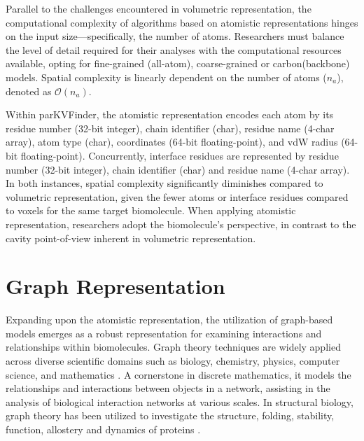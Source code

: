 \documentclass[Ingles]{phdthesis}
\begin{document}
Parallel to the challenges encountered in volumetric representation, the computational complexity of algorithms based on atomistic representations hinges on the input size---specifically, the number of atoms. Researchers must balance the level of detail required for their analyses with the computational resources available, opting for fine-grained (all-atom), coarse-grained or carbon\textalpha\space (backbone) models. Spatial complexity is linearly dependent on the number of atoms ($n_a$), denoted as $\mathcal{O}(n_a)$. 

Within parKVFinder, the atomistic representation encodes each atom by its residue number (32-bit integer), chain identifier (char), residue name (4-char array), atom type (char), coordinates (64-bit floating-point), and \acs{vdW} radius (64-bit floating-point). Concurrently, interface residues are represented by residue number (32-bit integer), chain identifier (char) and residue name (4-char array). In both instances, spatial complexity significantly diminishes compared to volumetric representation, given the fewer atoms or interface residues compared to voxels for the same target biomolecule. When applying atomistic representation, researchers adopt the biomolecule's perspective, in contrast to the cavity point-of-view inherent in volumetric representation.

\section{Graph Representation \label{sec:graph-representation}}

Expanding upon the atomistic representation, the utilization of graph-based models emerges as a robust representation for examining interactions and relationships within biomolecules. Graph theory techniques are widely applied across diverse scientific domains such as biology, chemistry, physics, computer science, and mathematics \cite{foulds1995, majeed2020}. A cornerstone in discrete mathematics, it models the relationships and interactions between objects in a network, assisting in the analysis of biological interaction networks at various scales. In structural biology, graph theory has been utilized to investigate the structure, folding, stability, function, allostery and dynamics of proteins \cite{vishveshwara2002,dipaola2015,heal2018,kantelis2022}.
\end{document}
